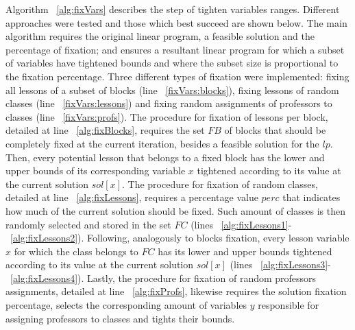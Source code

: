 Algorithm ~\ref{alg:fixVars} describes the step of tighten variables ranges. Different approaches were tested and those which best succeed are shown below. The main algorithm requires the original linear program, a feasible solution and the percentage of fixation; and ensures a resultant linear program for which a subset of variables have tightened bounds and where the subset size is proportional to the fixation percentage. Three different types of fixation were implemented: fixing all lessons of a subset of blocks (line ~\ref{fixVars:blocks}), fixing lessons of random classes (line ~\ref{fixVars:lessons}) and fixing random assignments of professors to classes (line ~\ref{fixVars:profs}). The procedure for fixation of lessons per block, detailed at line ~\ref{alg:fixBlocks}, requires the set $FB$ of blocks that should be completely fixed at the current iteration, besides a feasible solution for the $lp$. Then, every potential lesson that belongs to a fixed block has the lower and upper bounds of its corresponding variable $x$ tightened according to its value at the current solution $sol[x]$. The procedure for fixation of random classes, detailed at line ~\ref{alg:fixLessons}, requires a percentage value $perc$ that indicates how much of the current solution should be fixed. Such amount of classes is then randomly selected and stored in the set $FC$ (lines ~\ref{alg:fixLessons1}-~\ref{alg:fixLessons2}). Following, analogously to blocks fixation, every lesson variable $x$ for which the class belongs to $FC$ has its lower and upper bounds tightened according to its value at the current solution $sol[x]$ (lines ~\ref{alg:fixLessons3}-~\ref{alg:fixLessons4}). Lastly, the procedure for fixation of random professors assignments, detailed at line ~\ref{alg:fixProfs}, likewise requires the solution fixation percentage, selects the corresponding amount of variables $y$ responsible for assigning professors to classes and tights their bounds.
		
